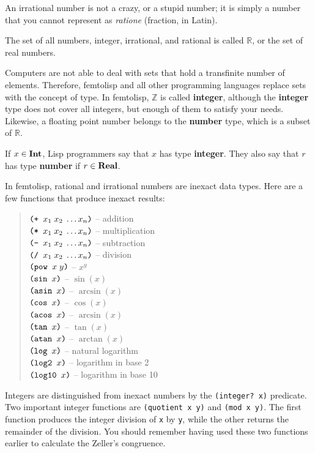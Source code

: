 \documentclass[a4paper,12pt]{book}
\begin{document}
An irrational number
is not a crazy, or a stupid number; it is simply a number that you cannot represent
as {\em ratione} (fraction, in Latin).

The set of all numbers, integer, 
irrational, and rational is called $\mathbb{R}$, or
the set of real numbers. 

Computers are not able to deal
with sets that hold a transfinite number of
elements. Therefore, femtolisp and
all other programming languages
replace sets with the concept of type.
In femtolisp, $\mathbb{Z}$ is 
called {\bf integer}, although
the {\bf integer} type does not cover all integers, 
but enough of them to satisfy
your needs. Likewise, a floating point
number belongs to the {\bf number} type, 
which is a subset of $\mathbb{R}$.


If $x\in{\bf Int}$, Lisp programmers say that $x$ has type
\label{type:definition}  {\bf integer}. They also
say that $r$ has type {\bf number} if $r\in {\bf Real}$.

In femtolisp, rational and irrational numbers
are inexact data types. Here are a few functions
that produce inexact results:
\begin{quote}
$\verb|(+ |x_1\;x_2\;\ldots x_n\verb|)|$ -- addition\\
$\verb|(* |x_1\;x_2\;\ldots x_n\verb|)|$ -- multiplication\\
$\verb|(- |x_1\;x_2\;\ldots x_n\verb|)|$ -- subtraction\\
$\verb|(/ |x_1\;x_2\;\ldots x_n\verb|)|$ -- division\\
$\verb|(pow |x\;y\verb|)|$ -- $x^y$\\
$\verb|(sin | x \verb|)|$ -- $\sin(x)$\\
$\verb|(asin | x \verb|)|$ -- $\arcsin(x)$\\
$\verb|(cos | x \verb|)|$ -- $\cos(x)$\\
$\verb|(acos | x \verb|)|$ -- $\arcsin(x)$\\ 
$\verb|(tan | x \verb|)|$ -- $\tan(x)$\\
$\verb|(atan | x \verb|)|$ -- $\arctan(x)$\\
$\verb|(log | x \verb|)|$ -- natural logarithm\\
$\verb|(log2 | x \verb|)|$ -- logarithm in base 2\\
$\verb|(log10 | x \verb|)|$ -- logarithm in base 10
\end{quote}
Integers are distinguished from inexact numbers
by the \verb|(integer? x)| predicate. Two important
integer functions are \verb|(quotient x y)| and
\verb|(mod x y)|. The first function
produces the integer division of \verb|x|
by \verb|y|, while the other returns
the remainder of the division. You should remember
having used
these two functions earlier to calculate the Zeller's
congruence.
\end{document}
